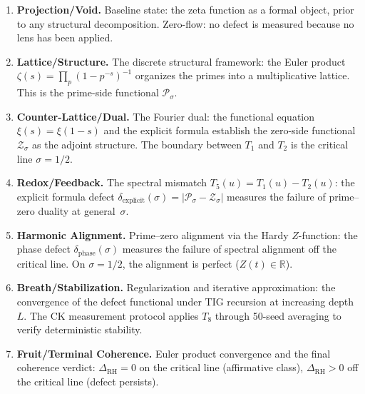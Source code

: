 \documentclass[11pt]{article}
\theoremstyle{remark}
\begin{document}
\begin{enumerate}
  \item[\textbf{$T_0$}] \textbf{Projection/Void.}
    Baseline state: the zeta function as a formal object, prior to any structural
    decomposition.
    Zero-flow: no defect is measured because no lens has been applied.

  \item[\textbf{$T_1$}] \textbf{Lattice/Structure.}
    The discrete structural framework: the Euler product
    $\zeta(s)=\prod_p(1-p^{-s})^{-1}$ organizes the primes into a multiplicative
    lattice.
    This is the prime-side functional $\mathcal{P}_\sigma$.

  \item[\textbf{$T_2$}] \textbf{Counter-Lattice/Dual.}
    The Fourier dual: the functional equation $\xi(s)=\xi(1-s)$ and the explicit
    formula establish the zero-side functional $\mathcal{Z}_\sigma$ as the adjoint
    structure.
    The boundary between $T_1$ and $T_2$ is the critical line $\sigma=1/2$.

  \item[\textbf{$T_5$}] \textbf{Redox/Feedback.}
    The spectral mismatch $T_5(u)=T_1(u)-T_2(u)$: the explicit formula defect
    $\delta_{\mathrm{explicit}}(\sigma)=|\mathcal{P}_\sigma-\mathcal{Z}_\sigma|$
    measures the failure of prime--zero duality at general~$\sigma$.

  \item[\textbf{$T_7$}] \textbf{Harmonic Alignment.}
    Prime--zero alignment via the Hardy $Z$-function: the phase defect
    $\delta_{\mathrm{phase}}(\sigma)$ measures the failure of spectral alignment off the
    critical line.
    On $\sigma=1/2$, the alignment is perfect ($Z(t)\in\mathbb{R}$).

  \item[\textbf{$T_8$}] \textbf{Breath/Stabilization.}
    Regularization and iterative approximation: the convergence of the defect functional
    under TIG recursion at increasing depth~$L$.
    The CK measurement protocol applies $T_8$ through 50-seed averaging to verify
    deterministic stability.

  \item[\textbf{$T_9$}] \textbf{Fruit/Terminal Coherence.}
    Euler product convergence and the final coherence verdict: $\Delta_{\mathrm{RH}}=0$
    on the critical line (affirmative class), $\Delta_{\mathrm{RH}}>0$ off the critical
    line (defect persists).
\end{enumerate}
\end{document}
